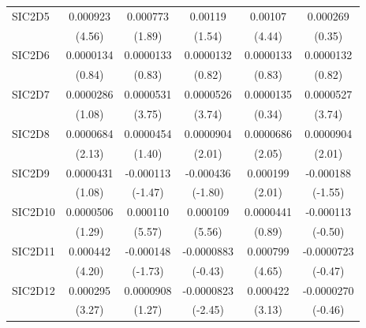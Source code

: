 \begin{table}[htbp]
\begin{tabular}{l*{5}{c}}
SIC2D5      &    0.000923\sym{***}&    0.000773         &     0.00119         &     0.00107\sym{***}&    0.000269         \\
            &      (4.56)         &      (1.89)         &      (1.54)         &      (4.44)         &      (0.35)         \\
SIC2D6      &   0.0000134         &   0.0000133         &   0.0000132         &   0.0000133         &   0.0000132         \\
            &      (0.84)         &      (0.83)         &      (0.82)         &      (0.83)         &      (0.82)         \\
SIC2D7      &   0.0000286         &   0.0000531\sym{***}&   0.0000526\sym{***}&   0.0000135         &   0.0000527\sym{***}\\
            &      (1.08)         &      (3.75)         &      (3.74)         &      (0.34)         &      (3.74)         \\
SIC2D8      &   0.0000684\sym{*}  &   0.0000454         &   0.0000904\sym{*}  &   0.0000686\sym{*}  &   0.0000904\sym{*}  \\
            &      (2.13)         &      (1.40)         &      (2.01)         &      (2.05)         &      (2.01)         \\
SIC2D9      &   0.0000431         &   -0.000113         &   -0.000436         &    0.000199\sym{*}  &   -0.000188         \\
            &      (1.08)         &     (-1.47)         &     (-1.80)         &      (2.01)         &     (-1.55)         \\
SIC2D10     &   0.0000506         &    0.000110\sym{***}&    0.000109\sym{***}&   0.0000441         &   -0.000113         \\
            &      (1.29)         &      (5.57)         &      (5.56)         &      (0.89)         &     (-0.50)         \\
SIC2D11     &    0.000442\sym{***}&   -0.000148         &  -0.0000883         &    0.000799\sym{***}&  -0.0000723         \\
            &      (4.20)         &     (-1.73)         &     (-0.43)         &      (4.65)         &     (-0.47)         \\
SIC2D12     &    0.000295\sym{**} &   0.0000908         &  -0.0000823\sym{*}  &    0.000422\sym{**} &  -0.0000270         \\
            &      (3.27)         &      (1.27)         &     (-2.45)         &      (3.13)         &     (-0.46)         \\

\end{tabular}
\end{table}
